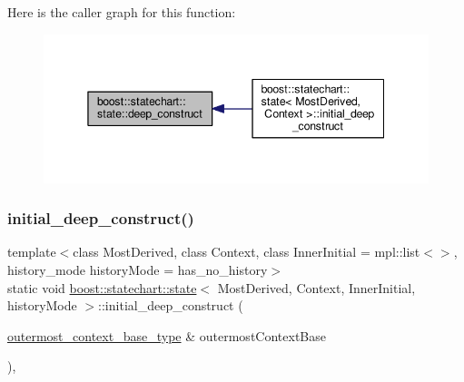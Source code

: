 Here is the caller graph for this function\+:
\nopagebreak
\begin{figure}[H]
\begin{center}
\leavevmode
\includegraphics[width=345pt]{classboost_1_1statechart_1_1state_aed04b0d2e74450ef8d1a2dd821001e39_icgraph}
\end{center}
\end{figure}
\mbox{\label{classboost_1_1statechart_1_1state_acb18541c13a54a7dcaecece53bcbf8df}} 
\subsubsection{\texorpdfstring{initial\+\_\+deep\+\_\+construct()}{initial\_deep\_construct()}}
{\footnotesize\ttfamily template$<$class Most\+Derived, class Context, class Inner\+Initial = mpl\+::list$<$$>$, history\+\_\+mode history\+Mode = has\+\_\+no\+\_\+history$>$ \\
static void \mbox{\hyperlink{classboost_1_1statechart_1_1state}{boost\+::statechart\+::state}}$<$ Most\+Derived, Context, Inner\+Initial, history\+Mode $>$\+::initial\+\_\+deep\+\_\+construct (\begin{DoxyParamCaption}\item[{\mbox{\hyperlink{classboost_1_1statechart_1_1simple__state_a50f21d7a7d6632eb34430e74cbad3197}{outermost\+\_\+context\+\_\+base\+\_\+type}} \&}]{outermost\+Context\+Base }\end{DoxyParamCaption})\hspace{0.3cm}{\ttfamily [inline]}, {\ttfamily [static]}}

\mbox{\label{classboost_1_1statechart_1_1state_afd7debb4aea8513b34941ba356767701}} 

